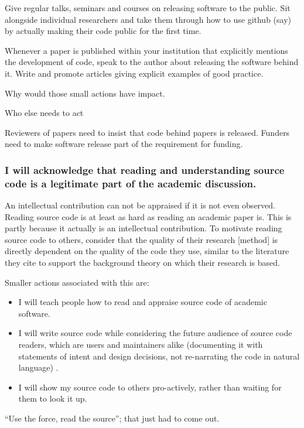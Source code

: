 \documentclass[a4paper,UKenglish]{dagman}
\renewcommand{\paragraph}[1]{\subsubsection*{#1}\xspace}
\begin{document}
Give regular talks, seminars and courses on releasing software to the public. 
Sit alongside individual researchers and take them through how to use github (say) by actually making their code public for the first time.

Whenever a paper is published within your institution that explicitly mentions the development of code, speak to the author about releasing the software behind it. Write and promote articles giving explicit examples of good practice.

Why would those small actions have impact.



Who else needs to act

Reviewers of papers need to insist that code behind papers is released. Funders need to make software release part of the requirement for funding.



\paragraph{I will acknowledge that reading and understanding source code is a legitimate part of the academic discussion.}

An intellectual contribution can not be appraised if it is not even observed. Reading source code is at least as hard as reading an academic paper is. This is partly because it actually is an intellectual contribution. To motivate reading source code to others, consider that the quality of their research [method] is directly dependent on the quality of the code they use, similar to the literature they cite to support the background theory on which their research is based. 

Smaller actions associated with this are:
\begin{itemize}
\item I will teach people how to read and appraise source code of academic software.
\item I will write source code while considering the future audience of source code readers, which are users and maintainers alike (documenting it with statements of intent and design decisions, not re-narrating the code in natural language) .
\item I will show my source code to others pro-actively, rather than waiting for them to look it up.
\end{itemize}

``Use the force, read the source''; that just had to come out.
\end{document}
